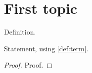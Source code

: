 
\section{First topic}

\begin{definition}[Term]\label{def:term}
  Definition.
\end{definition}

\begin{theorem}[Result]\label{thm:result}
  Statement, using \cref{def:term}.
\end{theorem}

\begin{proof}
  Proof.
\end{proof}
